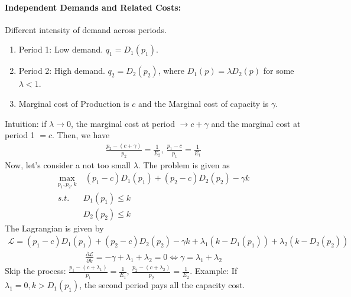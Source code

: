 \documentclass[11pt]{elegantbook}
\begin{document}
\paragraph*{Independent Demands and Related Costs:}
\begin{example}
    Different intensity of demand across periods.
    \begin{enumerate}
        \item Period 1: Low demand. $q_1=D_1(p_1)$.
        \item Period 2: High demand. $q_2=D_2(p_2)$, where $D_1(p)=\lambda D_2(p)$ for some $\lambda<1$.
        \item Marginal cost of Production is $c$ and the Marginal cost of capacity is $\gamma$.
    \end{enumerate}
\end{example}
Intuition: if $\lambda \rightarrow 0$, the marginal cost at period $\rightarrow c+\gamma$ and the marginal cost at period 1 $=c$. Then, we have
\begin{equation}
    \begin{aligned}
        \frac{p_2-(c+\gamma)}{p_2}=\frac{1}{E_2},\ \frac{p_1-c}{p_1}=\frac{1}{E_1}
    \end{aligned}
    \nonumber
\end{equation}
Now, let's consider a not too small $\lambda$. The problem is given as
\begin{equation}
    \begin{aligned}
        \max_{p_1,p_2,k}&\ (p_1-c)D_1(p_1)+(p_2-c)D_2(p_2)-\gamma k\\
        s.t.\ & D_1(p_1)\leq k\\
        & D_2(p_2)\leq k
    \end{aligned}
    \nonumber
\end{equation}
The Lagrangian is given by
\begin{equation}
    \begin{aligned}
        \mathcal{L}=(p_1-c)D_1(p_1)+(p_2-c)D_2(p_2)-\gamma k+\lambda_1(k-D_1(p_1))+\lambda_2(k-D_2(p_2))
    \end{aligned}
    \nonumber
\end{equation}
\begin{equation}
    \begin{aligned}
        \frac{\partial \mathcal{L}}{\partial k}=-\gamma+\lambda_1+\lambda_2=0 \Leftrightarrow \gamma=\lambda_1+\lambda_2
    \end{aligned}
    \nonumber
\end{equation}
Skip the process: $\frac{p_1-(c+\lambda_1)}{p_1}=\frac{1}{E_1}$, $\frac{p_2-(c+\lambda_2)}{p_2}=\frac{1}{E_2}$. Example: If $\lambda_1=0, k>D_1(p_1)$, the second period pays all the capacity cost.
\end{document}
